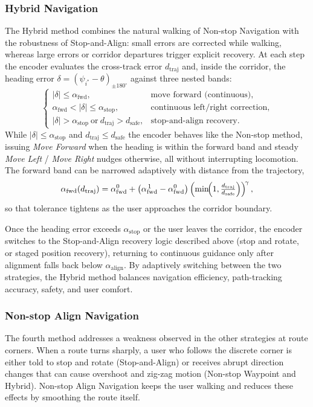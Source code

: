 \documentclass[12pt]{report}
\begin{document}
\subsubsection*{Hybrid Navigation}

The Hybrid method combines the natural walking of Non-stop Navigation with the robustness of Stop-and-Align: small errors are corrected while walking, whereas large errors or corridor departures trigger explicit recovery. At each step the encoder evaluates the cross-track error $d_{\text{traj}}$ and, inside the corridor, the heading error $\delta=(\psi_{i^\ast}-\theta)_{\pm 180^\circ}$ against three nested bands:
\[
\begin{cases}
|\delta|\le\alpha_{\text{fwd}}, & \text{move forward (continuous)},\\[4pt]
\alpha_{\text{fwd}}<|\delta|\le\alpha_{\text{stop}}, & \text{continuous left/right correction},\\[4pt]
|\delta|>\alpha_{\text{stop}}\ \text{or}\ d_{\text{traj}}>d_{\text{safe}}, & \text{stop-and-align recovery}.
\end{cases}
\]
While $|\delta|\le\alpha_{\text{stop}}$ and $d_{\text{traj}}\le d_{\text{safe}}$ the encoder behaves like the Non-stop method, issuing \textit{Move Forward} when the heading is within the forward band and steady \textit{Move Left} / \textit{Move Right} nudges otherwise, all without interrupting locomotion. The forward band can be narrowed adaptively with distance from the trajectory,
\[
\alpha_{\text{fwd}}(d_{\text{traj}})=
\alpha_{\text{fwd}}^{0}+\bigl(\alpha_{\text{fwd}}^{\,1}-\alpha_{\text{fwd}}^{0}\bigr)
\left(\min\!\Bigl(1,\tfrac{d_{\text{traj}}}{d_{\text{safe}}}\Bigr)\right)^{\!\gamma},
\]
so that tolerance tightens as the user approaches the corridor boundary.

Once the heading error exceeds $\alpha_{\text{stop}}$ or the user leaves the corridor, the encoder switches to the Stop-and-Align recovery logic described above (stop and rotate, or staged position recovery), returning to continuous guidance only after alignment falls back below $\alpha_{\text{align}}$. By adaptively switching between the two strategies, the Hybrid method balances navigation efficiency, path-tracking accuracy, safety, and user comfort.

\subsubsection*{Non-stop Align Navigation}

The fourth method addresses a weakness observed in the other strategies at route corners. When a route turns sharply, a user who follows the discrete corner is either told to stop and rotate (Stop-and-Align) or receives abrupt direction changes that can cause overshoot and zig-zag motion (Non-stop Waypoint and Hybrid). Non-stop Align Navigation keeps the user walking and reduces these effects by smoothing the route itself.
\end{document}
